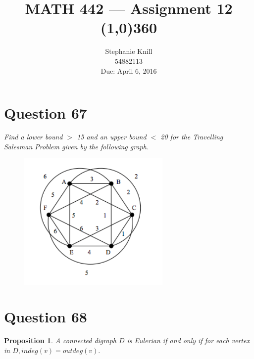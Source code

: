 \documentclass[11pt, oneside]{article}   	%
\newtheorem{proposition}{Proposition}
\begin{document}
\title{MATH 442 --- Assignment 12 \\
\line(1,0){360} \\              %
}
\author{
Stephanie Knill \\
54882113 \\
Due: April 6, 2016}

\date{}                   %
\maketitle




\section*{Question 67}

\emph{Find a lower bound $>$ 15 and an upper bound $<$ 20 for the Travelling Salesman Problem given by the following graph.}
\begin{figure}[h]                                   
\begin{center}
\includegraphics[width=.4\textwidth]{q1.png}
\end{center}
\end{figure}

\cleardoublepage


\section*{Question 68}

\begin{proposition}
A connected digraph $D$ is Eulerian if and only if for each vertex in $D, indeg(v) =outdeg(v).$
\end{proposition}
\end{document}
